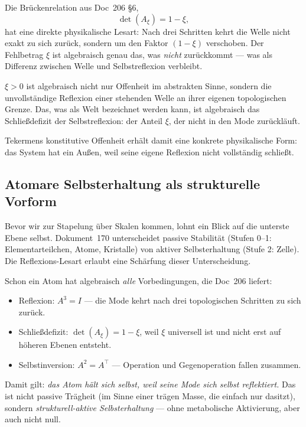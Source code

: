 Die Brückenrelation aus Doc~206 \S6,
\begin{equation}
\det(A_\xi) = 1 - \xi,
\end{equation}
hat eine direkte physikalische Lesart: Nach drei Schritten kehrt die Welle nicht exakt zu sich zurück, sondern um den Faktor $(1-\xi)$ verschoben. Der Fehlbetrag $\xi$ ist algebraisch genau das, was \emph{nicht} zurückkommt --- was als Differenz zwischen Welle und Selbstreflexion verbleibt.

\begin{important}
$\xi > 0$ ist algebraisch nicht nur \glqq Offenheit\grqq{} im abstrakten Sinne, sondern die unvollständige Reflexion einer stehenden Welle an ihrer eigenen topologischen Grenze. Das, was als \glqq Welt\grqq{} bezeichnet werden kann, ist algebraisch das Schließdefizit der Selbstreflexion: der Anteil $\xi$, der nicht in den Mode zurückläuft.

Tekermens konstitutive Offenheit erhält damit eine konkrete physikalische Form: das System hat ein Außen, weil seine eigene Reflexion nicht vollständig schließt.
\end{important}

\subsection{Atomare Selbsterhaltung als strukturelle Vorform}\label{sec:reflexion_atom}

Bevor wir zur Stapelung über Skalen kommen, lohnt ein Blick auf die unterste Ebene selbst. Dokument~170 unterscheidet \glqq passive Stabilität\grqq{} (Stufen 0--1: Elementarteilchen, Atome, Kristalle) von \glqq aktiver Selbsterhaltung\grqq{} (Stufe 2: Zelle). Die Reflexions-Lesart erlaubt eine Schärfung dieser Unterscheidung.

Schon ein Atom hat algebraisch \emph{alle} Vorbedingungen, die Doc~206 liefert:

\begin{itemize}
\item Reflexion: $A^3 = I$ --- die Mode kehrt nach drei topologischen Schritten zu sich zurück.
\item Schließdefizit: $\det(A_\xi) = 1 - \xi$, weil $\xi$ universell ist und nicht erst auf höheren Ebenen entsteht.
\item Selbstinversion: $A^2 = A^\top$ --- Operation und Gegenoperation fallen zusammen.
\end{itemize}

Damit gilt: \emph{das Atom hält sich selbst, weil seine Mode sich selbst reflektiert.} Das ist nicht passive Trägheit (im Sinne einer trägen Masse, die einfach nur dasitzt), sondern \emph{strukturell-aktive Selbsterhaltung} --- ohne metabolische Aktivierung, aber auch nicht null.

